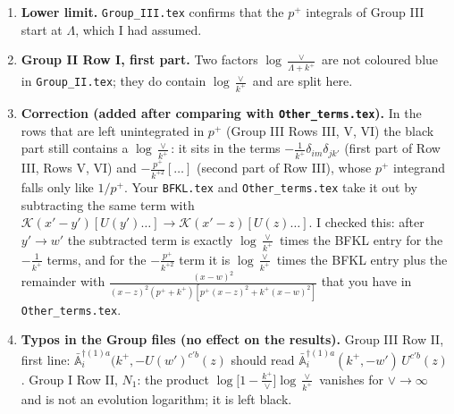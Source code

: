 \documentclass[9pt]{article}
\numberwithin{equation}{section}
\newcommand{\chg}[1]{{\color{red}#1}}
\begin{document}
\begin{enumerate}
\item \textbf{Lower limit.} \texttt{Group\_III.tex} confirms that the $p^{+}$ integrals of Group III start at $\Lambda$, which I had assumed.
\item \textbf{Group II Row I, first part.} Two factors $\log\frac{\vee}{\Lambda+k^{+}}$ are not coloured blue in \texttt{Group\_II.tex}; they do contain $\log\frac{\vee}{k^{+}}$ and are split here.
\item \chg{\textbf{Correction (added after comparing with \texttt{Other\_terms.tex}).}} \chg{In the rows that are left unintegrated in $p^{+}$ (Group III Rows III, V, VI) the black part still contains a $\log\frac{\vee}{k^{+}}$: it sits in the terms $-\frac{1}{k^{+}}\delta_{im}\delta_{jk'}$ (first part of Row III, Rows V, VI) and $-\frac{p^{+}}{k^{+2}}[\ldots]$ (second part of Row III), whose $p^{+}$ integrand falls only like $1/p^{+}$. Your \texttt{BFKL.tex} and \texttt{Other\_terms.tex} take it out by subtracting the same term with $\mathcal{K}(x'-y')[U(y')\ldots]\to\mathcal{K}(x'-z)[U(z)\ldots]$. I checked this: after $y'\to w'$ the subtracted term is exactly $\log\frac{\vee}{k^{+}}$ times the BFKL entry for the $-\frac{1}{k^{+}}$ terms, and for the $-\frac{p^{+}}{k^{+2}}$ term it is $\log\frac{\vee}{k^{+}}$ times the BFKL entry plus the remainder with $\frac{(x-w)^{2}}{(x-z)^{2}(p^{+}+k^{+})[p^{+}(x-z)^{2}+k^{+}(x-w)^{2}]}$ that you have in \texttt{Other\_terms.tex}.}
\item \textbf{Typos in the Group files (no effect on the results).} Group III Row II, first line: $\bar{\mathbb{A}}^{\dagger(1)a}_{i}(k^{+},-U(w')^{c'b}(z)$ should read $\bar{\mathbb{A}}^{\dagger(1)a}_{i}(k^{+},-w')\,U^{c'b}(z)$. Group I Row II, $N_{1}$: the product $\log\big[1-\frac{k^{+}}{\vee}\big]\log\frac{\vee}{k^{+}}$ vanishes for $\vee\to\infty$ and is not an evolution logarithm; it is left black.
\end{enumerate}
\end{document}
